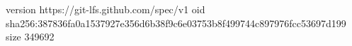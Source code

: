version https://git-lfs.github.com/spec/v1
oid sha256:387836fa0a1537927e356d6b38f9c6e03753b8f499744c897976fcc53697d199
size 349692
